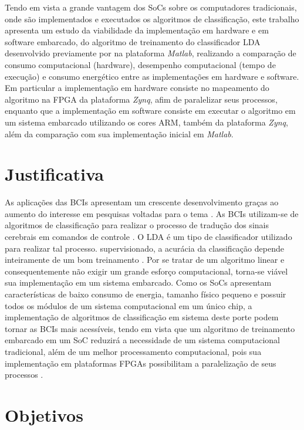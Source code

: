 Tendo em vista a grande vantagem dos SoCs sobre os computadores tradicionais, onde são implementados e executados os algoritmos de classificação, este trabalho apresenta um estudo da viabilidade da implementação em hardware e em software embarcado, do algoritmo de treinamento do classificador LDA desenvolvido previamente por \cite{F.Lotte} na plataforma \textit{Matlab}, realizando a comparação de consumo computacional (hardware), desempenho computacional (tempo de execução) e consumo energético entre as implementações em hardware e software. Em particular a implementação em hardware consiste no mapeamento do algoritmo na FPGA da plataforma \textit{Zynq}, afim de paralelizar seus processos, enquanto que a implementação em software consiste em executar o algoritmo em um sistema embarcado utilizando os cores ARM, também da plataforma \textit{Zynq}, além da comparação com sua implementação inicial em \textit{Matlab}.


\section{Justificativa}
As aplicações das BCIs apresentam um crescente desenvolvimento  graças ao aumento do interesse em pesquisas voltadas para o tema \cite{BCICompetition} . As BCIs utilizam-se de algoritmos de classificação para realizar o processo de tradução dos sinais cerebrais em comandos de controle \cite{MasonAndBirch}. O LDA é um tipo de classificador utilizado para realizar tal processo.  supervisionado, a acurácia da classificação depende inteiramente de um bom treinamento \cite{F.Lotte}. Por se tratar de um algoritmo linear e consequentemente não exigir um grande esforço computacional, torna-se viável sua implementação em um sistema embarcado. Como os SoCs apresentam características de baixo consumo de energia, tamanho físico pequeno e possuir todos os módulos de um sistema computacional em um único chip, a implementação de algoritmos de classificação em sistema deste porte podem tornar as BCIs mais acessíveis, tendo em vista que um algoritmo de treinamento embarcado em um SoC reduzirá a necessidade de um sistema computacional tradicional, além de um melhor processamento computacional, pois sua implementação em plataformas FPGAs possibilitam a paralelização de seus processos \cite{zynqBook}.

\section{Objetivos}

